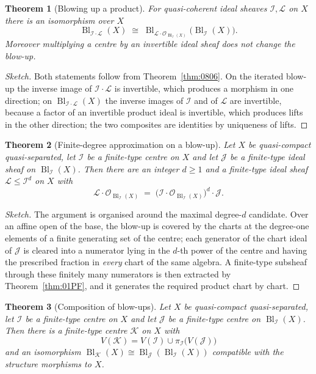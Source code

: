 \documentclass[11pt,a4paper]{article}
\theoremstyle{plain}
\newtheorem{theorem}{Theorem}[section]
\theoremstyle{definition}
\theoremstyle{remark}
\newcommand{\Bl}{\operatorname{Bl}}
\newcommand{\sO}{\mathcal{O}}
\newcommand{\sI}{\mathcal{I}}
\newcommand{\sJ}{\mathcal{J}}
\newcommand{\sK}{\mathcal{K}}
\newcommand{\sL}{\mathcal{L}}
\newcommand{\qcqs}{quasi-compact quasi-separated}
\begin{document}
\begin{theorem}[Blowing up a product]
\label{thm:080A}
For quasi-coherent ideal sheaves $\sI,\sL$ on $X$ there is an isomorphism over
$X$
\[
  \Bl_{\sI\cdot\sL}(X)\;\cong\;\Bl_{\sL\cdot\sO_{\Bl_\sI(X)}}\bigl(\Bl_\sI(X)\bigr).
\]
Moreover multiplying a centre by an invertible ideal sheaf does not change the
blow-up.
\end{theorem}

\begin{proof}[Sketch]
Both statements follow from Theorem~\ref{thm:0806}. On the iterated blow-up the
inverse image of $\sI\cdot\sL$ is invertible, which produces a morphism in one
direction; on $\Bl_{\sI\cdot\sL}(X)$ the inverse images of $\sI$ and of $\sL$
are invertible, because a factor of an invertible product ideal is invertible,
which produces lifts in the other direction; the two composites are identities
by uniqueness of lifts.
\end{proof}

\begin{theorem}[Finite-degree approximation on a blow-up]
\label{thm:0803}
Let $X$ be \qcqs{}, let $\sI$ be a finite-type centre on $X$ and let $\sJ$ be a
finite-type ideal sheaf on $\Bl_\sI(X)$. Then there are an integer $d\ge 1$ and
a finite-type ideal sheaf $\sL\le\sI^{d}$ on $X$ with
\[
  \sL\cdot\sO_{\Bl_\sI(X)} \;=\; \bigl(\sI\cdot\sO_{\Bl_\sI(X)}\bigr)^{d}\cdot\sJ .
\]
\end{theorem}

\begin{proof}[Sketch]
The argument is organised around the maximal degree-$d$ candidate. Over an
affine open of the base, the blow-up is covered by the charts at the
degree-one elements of a finite generating set of the centre; each generator
of the chart ideal of $\sJ$ is cleared into a numerator lying in the $d$-th
power of the centre and having the prescribed fraction in \emph{every} chart of
the same algebra. A finite-type subsheaf through these finitely many
numerators is then extracted by Theorem~\ref{thm:01PF}, and it generates the
required product chart by chart.
\end{proof}

\begin{theorem}[Composition of blow-ups]
\label{thm:080B}
Let $X$ be \qcqs{}, let $\sI$ be a finite-type centre on $X$ and let $\sJ$ be a
finite-type centre on $\Bl_\sI(X)$. Then there is a finite-type centre $\sK$ on
$X$ with
\[
  V(\sK)=V(\sI)\cup\pi_\sI\bigl(V(\sJ)\bigr)
\]
and an isomorphism $\Bl_\sK(X)\cong\Bl_\sJ(\Bl_\sI(X))$ compatible with the
structure morphisms to $X$.
\end{theorem}
\end{document}
